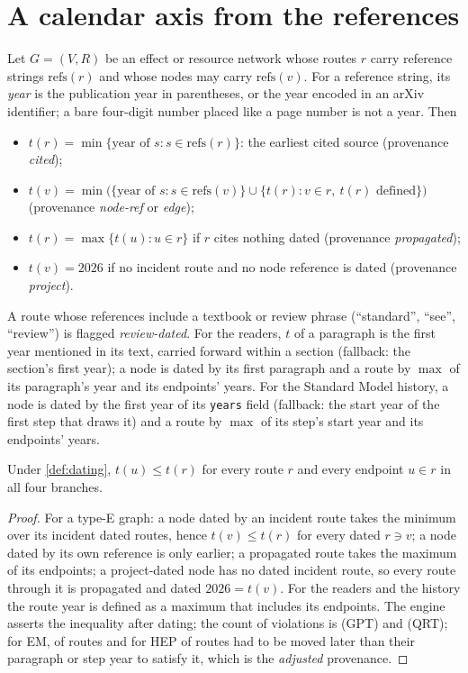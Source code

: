 \section{A calendar axis from the references}\label{sec:dating}
\begin{definition}\label{def:dating}
Let $G=(V,R)$ be an effect or resource network whose routes $r$ carry reference strings $\mathrm{refs}(r)$ and whose nodes may carry $\mathrm{refs}(v)$. For a reference string, its \emph{year} is the publication year in parentheses, or the year encoded in an arXiv identifier; a bare four-digit number placed like a page number is not a year. Then
\begin{itemize}[nosep]
\item $t(r)=\min\{\text{year of } s : s\in\mathrm{refs}(r)\}$: the earliest cited source (provenance \emph{cited});
\item $t(v)=\min\bigl(\{\text{year of } s: s\in\mathrm{refs}(v)\}\cup\{t(r): v\in r,\ t(r)\text{ defined}\}\bigr)$ (provenance \emph{node-ref} or \emph{edge});
\item $t(r)=\max\{t(u): u\in r\}$ if $r$ cites nothing dated (provenance \emph{propagated});
\item $t(v)=2026$ if no incident route and no node reference is dated (provenance \emph{project}).
\end{itemize}
A route whose references include a textbook or review phrase (``standard'', ``see'', ``review'') is flagged \emph{review-dated}. For the readers, $t$ of a paragraph is the first year mentioned in its text, carried forward within a section (fallback: the section's first year); a node is dated by its first paragraph and a route by $\max$ of its paragraph's year and its endpoints' years. For the Standard Model history, a node is dated by the first year of its \texttt{years} field (fallback: the start year of the first step that draws it) and a route by $\max$ of its step's start year and its endpoints' years.
\end{definition}

\begin{lemma}\label{lem:filtration}
Under \cref{def:dating}, $t(u)\le t(r)$ for every route $r$ and every endpoint $u\in r$ in all four branches.
\end{lemma}
\begin{proof}
For a type-E graph: a node dated by an incident route takes the minimum over its incident dated routes, hence $t(v)\le t(r)$ for every dated $r\ni v$; a node dated by its own reference is only earlier; a propagated route takes the maximum of its endpoints; a project-dated node has no dated incident route, so every route through it is propagated and dated $2026=t(v)$. For the readers and the history the route year is defined as a maximum that includes its endpoints. The engine asserts the inequality after dating; the count of violations is \EGPTForward{} (GPT) and \EQRTForward{} (QRT); for EM, \EemAdjusted{} of \EEMEfin{} routes and for HEP \EhepAdjusted{} of \EhepUnionRoutes{} routes had to be moved later than their paragraph or step year to satisfy it, which is the \emph{adjusted} provenance.
\end{proof}

